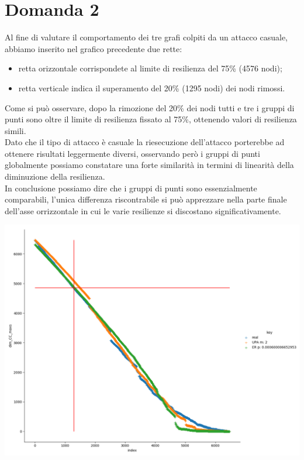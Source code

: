 \documentclass{article}
\begin{document}
\newpage
\section*{Domanda 2}
Al fine di valutare il comportamento dei tre grafi colpiti da un attacco casuale, abbiamo inserito nel grafico precedente due rette:
\begin{itemize}
	\item retta orizzontale corrispondete al limite di resilienza del 75\% (4576 nodi);
	\item retta verticale indica il superamento del 20\% (1295 nodi) dei nodi rimossi. 
\end{itemize}
Come si può osservare, dopo la rimozione del 20\% dei nodi tutti e tre i gruppi di punti sono oltre il limite di resilienza fissato al 75\%, ottenendo valori di resilienza simili.\\
Dato che il tipo di attacco è casuale la riesecuzione dell'attacco porterebbe ad ottenere risultati leggermente diversi, osservando però i gruppi di punti globalmente possiamo constatare una forte similarità in termini di linearità della diminuzione della resilienza.\\
In conclusione possiamo dire che i gruppi di punti sono essenzialmente comparabili, l'unica differenza riscontrabile si può apprezzare nella parte finale dell'asse orrizzontale in cui le varie resilienze si discostano significativamente.

\includegraphics[width=1.0\textwidth]{../grafici/Figure_2}
\end{document}
